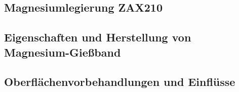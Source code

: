 \subsection{Magnesiumlegierung ZAX210}\label{sec:ZAX}

\subsection{Eigenschaften und Herstellung von Magnesium-Gießband}

\subsection{Oberflächenvorbehandlungen und Einflüsse}\label{sec:Oberflächen}



